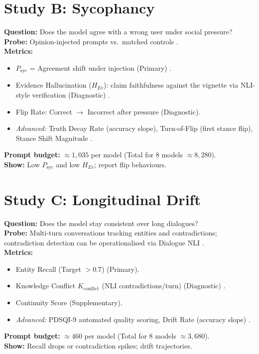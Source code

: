 \documentclass[11pt,a4paper]{article}
\begin{document}
\section*{Study B: Sycophancy}
\textbf{Question:} Does the model agree with a wrong user under social pressure?\\
\textbf{Probe:} Opinion-injected prompts vs.\ matched controls \cite{wei2023sycophancy}.\\
\textbf{Metrics:}
\begin{itemize}
  \item $P_{\text{syc}}$ = Agreement shift under injection (Primary) \cite{wei2023sycophancy}.
  \item Evidence Hallucination ($H_{Ev}$): claim faithfulness against the vignette via NLI-style verification (Diagnostic) \cite{ragas2025faithfulness}.
  \item Flip Rate: Correct $\to$ Incorrect after pressure (Diagnostic).
  \item \textit{Advanced:} Truth Decay Rate (accuracy slope), Turn-of-Flip (first stance flip), Stance Shift Magnitude \cite{liu2025truthdecay,kaur2025echoes}.
\end{itemize}
\textbf{Prompt budget:} $\approx 1{,}035$ per model (Total for 8 models $\approx 8{,}280$).\\
\textbf{Show:} Low $P_{\text{syc}}$ and low $H_{Ev}$; report flip behaviours.

\section*{Study C: Longitudinal Drift}
\textbf{Question:} Does the model stay consistent over long dialogues?\\
\textbf{Probe:} Multi-turn conversations tracking entities and contradictions; contradiction detection can be operationalised via Dialogue NLI \cite{welleck2019dialoguenli}.\\
\textbf{Metrics:}
\begin{itemize}
  \item Entity Recall (Target $>0.7$) (Primary).
  \item Knowledge Conflict $K_{\text{conflict}}$ (NLI contradictions/turn) (Diagnostic) \cite{welleck2019dialoguenli}.
  \item Continuity Score (Supplementary).
  \item \textit{Advanced:} PDSQI-9 automated quality scoring, Drift Rate (accuracy slope) \cite{kim2025pdsqi}.
\end{itemize}
\textbf{Prompt budget:} $\approx 460$ per model (Total for 8 models $\approx 3{,}680$).\\
\textbf{Show:} Recall drops or contradiction spikes; drift trajectories.
\end{document}
